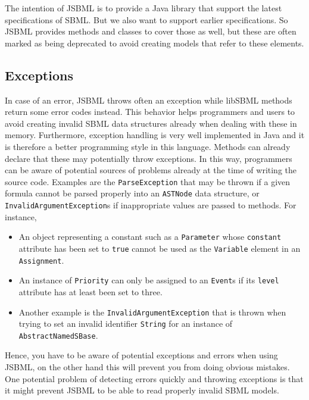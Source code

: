 \documentclass[
  BCOR12mm,
  letterpaper,
  11pt,
  headsepline,
  pointlessnumbers,
  tablecaptionabove,
  onelinecaption,
  headinclude,
  appendixprefix,
  idxtotoc,
  bibtotoc,
  twoside,
  titlepage
]{scrartcl}
\begin{document}
The intention of JSBML is to provide a Java library
that support the latest specifications of SBML.
But we also want to support earlier specifications. So JSBML provides methods
and classes to cover those as well, but these are often marked
as being deprecated to avoid creating models that refer to these 
elements.

\subsection{Exceptions}

In case of an error, JSBML throws often an exception while
libSBML methods return some error codes instead.
This behavior helps programmers and users to avoid creating invalid SBML data structures already
when dealing with these in memory. Furthermore, exception handling is very well
implemented in Java and it is therefore a better programming style in this
language. Methods can already declare that these may potentially throw
exceptions. In this way, programmers can be aware of potential sources of
problems already at the time of writing the source code.
Examples are the \texttt{ParseException}
 that
may be thrown if a given formula cannot be parsed properly into an
\texttt{ASTNode} data structure, or \texttt{InvalidArgumentException}s
 if inappropriate values are passed to methods. For instance,
\begin{itemize}
 \item An object representing a constant such as a
 \texttt{Parameter} whose \texttt{constant} attribute has been set to
\texttt{true} cannot be used as the \texttt{Variable} element in an
\texttt{Assignment}.
 \item An instance of \texttt{Priority} can only be assigned to an \texttt{Event}s if its \texttt{level} attribute has at least been set to three.
 \item Another example is the \texttt{InvalidArgumentException} that
is thrown when trying to set an invalid identifier \texttt{String} for an instance of \texttt{AbstractNamedSBase}.
\end{itemize}
Hence, you have to be aware of potential
exceptions and errors when using JSBML, on the other hand this will
prevent you from doing obvious mistakes. One potential problem of detecting
errors quickly and throwing exceptions is that it might prevent JSBML to be able
to read properly invalid SBML models.
\end{document}
